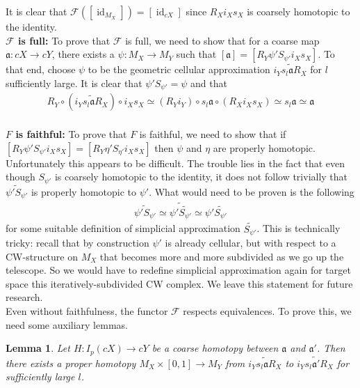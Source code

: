 \documentclass[a4paper,11pt]{article}
\theoremstyle{definition}
\theoremstyle{plain}
\newtheorem{lemma}[definition]{Lemma}
\theoremstyle{remark}
\DeclareMathOperator{\id}{id}
\begin{document}
{It is clear that $\mathcal{F}([\id_{M_{X}}]) = [\id_{cX}]$ since $R_{X}i_{X}s_{X}$ is coarsely homotopic to the identity. \\

\textbf{$\mathcal{F}$ is full:} To prove that $\mathcal{F}$ is full, we need to show that for a coarse map $\mathfrak{a}: cX\rightarrow cY$, there exists a $\psi: M_{X}\rightarrow M_{Y}$ such that $[\mathfrak{a}] = [R_{Y} \psi' S_{\psi'} i_{X}s_{X}]$. To that end, choose $\psi$ to be the geometric cellular approximation $\widetilde{i_{Y}s_{l}\mathfrak{a}R_{X}}$ for $l$ sufficiently large. It is clear that  $\psi'S_{\psi'} = \psi$ and that 
\begin{align*}
R_{Y} \circ (\widetilde{i_{Y}s_{l}\mathfrak{a}R_{X}})\circ i_{X}s_{X} \simeq (R_{Y}i_{Y})\circ s_{l} \mathfrak{a}\circ (R_{X} i_{X}s_{X}) \simeq s_{l} \mathfrak{a}\simeq \mathfrak{a}
\end{align*}\\
\textbf{$F$ is faithful:} To prove that $F$ is faithful, we need to show that if $[R_{Y} \psi' S_{\psi'} i_{X}s_{X}] = [R_{Y} \eta' S_{\eta'} i_{X}s_{X}]$ then $\psi$ and $\eta$ are properly homotopic. Unfortunately this appears to be difficult. The trouble lies in the fact that even though $S_{\psi'}$ is coarsely homotopic to the identity, it does not follow trivially that $\widetilde{\psi' S_{\psi'}}$ is properly homotopic to $\psi'$. What would need to be proven is the following
\begin{align*}
\widetilde{\psi' S_{\psi'}} \simeq \widetilde{\psi' \widetilde{S_{\psi'}}} \simeq \psi' \widetilde{S_{\psi'}}
\end{align*}
for some suitable definition of simplicial approximation $\widetilde{S_{\psi'}}$. This is technically tricky: recall that by construction $\psi'$ is already cellular, but with respect to a CW-structure on $M_{X}$ that becomes more and more subdivided as we go up the telescope. So we would have to redefine simplicial approximation again for target space this iteratively-subdivided CW complex. We leave this statement for future research.\\

Even without faithfulness, the functor $\mathcal{F}$ respects equivalences. To prove this, we need some auxiliary lemmas.

\begin{lemma} \label{chimpliesph} Let $H:I_p(cX)\rightarrow cY$ be a coarse homotopy between $\mathfrak{a}$ and $\mathfrak{a}'$. Then there exists a proper homotopy $M_{X} \times [0,1] \rightarrow M_{Y}$ from $\widetilde{i_{Y}s_{l}\mathfrak{a}R_{X}}$ to $\widetilde{i_{Y}s_{l}\mathfrak{a}'R_{X}}$ for sufficiently large $l$. 
\end{lemma}

}
\end{document}
